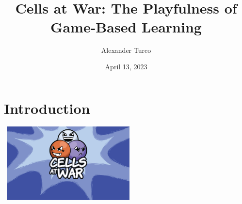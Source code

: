 \documentclass{beamer}
\title[BEAP Dec 2022]{Cells at War: The Playfulness of Game-Based Learning}
\author{Alexander Turco}
\date{April 13, 2023}
\begin{document}
	
	\section{Introduction}
	\begin{frame}
		\titlepage 
		\begin{center}
			\includegraphics[width=7cm, height=4cm]{cellsatwar.png}
		\end{center}
	\end{frame}
	
	\logo{}
	
		
				

	
\end{document}
